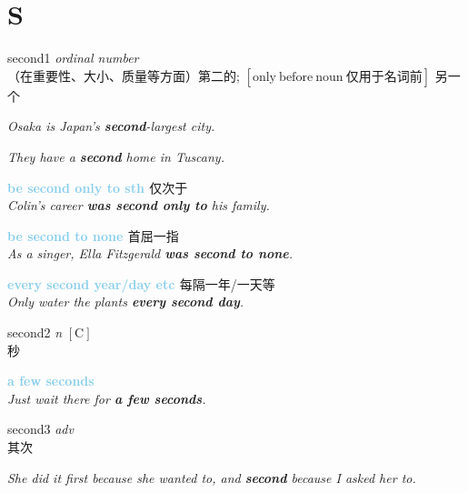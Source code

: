 \section{S}
\item[] {
    \lettrine{second}{1}  
    \textit{ordinal number} \\
    （在重要性、大小、质量等方面）第二的;
    $\mathrm{[ only \ before \ noun \ \mbox{仅用于名词前}]}$ 
    另一个

    \textit{Osaka is Japan's \textbf{second}-largest city.}

    \textit{They have a \textbf{second} home in Tuscany.}

    \textbf {
        \textcolor{SkyBlue} {
            be second only to sth
        }
    }
    仅次于 \\
    \textit{Colin's career \textbf{was second only to} his family.}

    \textbf {
        \textcolor{SkyBlue} {
            be second to none
        }
    }
    首屈一指 \\
    \textit{As a singer, Ella Fitzgerald \textbf{was second to none}.}
  
    \textbf {
        \textcolor{SkyBlue} {
            every second year/day etc
        }
    }
    每隔一年/一天等 \\
    \textit{Only water the plants \textbf{every second day}.}
} 

\item[] {
    \lettrine{second}{2}  
    \textit{n}
    $\mathrm{[C]}$ \\
    秒
    
    \textbf {
        \textcolor{SkyBlue} {
            a few seconds
        }
    }\\
    \textit{Just wait there for \textbf{a few seconds}.}
} 

\item[] {
    \lettrine{second}{3}  
    \textit{adv} \\
    其次
    
    \textit{She did it first because she wanted to, and \textbf{second} because I asked her to.}
} 

